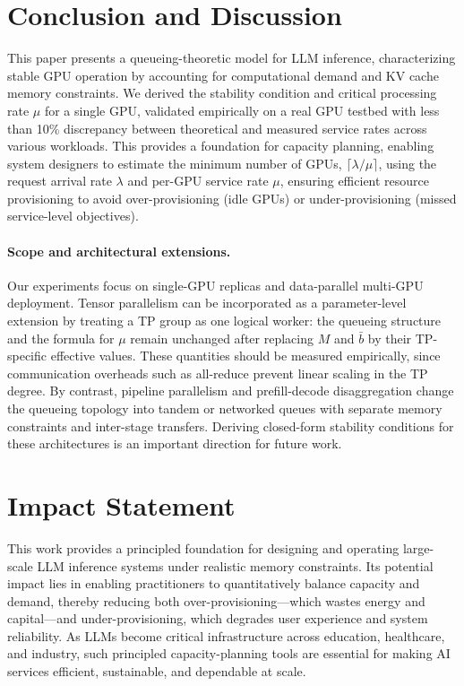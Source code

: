 \documentclass{article}
\theoremstyle{plain}
\theoremstyle{definition}
\theoremstyle{remark}
\begin{document}
\section{Conclusion and Discussion}
\label{sec:conclusion}

This paper presents a queueing-theoretic model for LLM inference, characterizing stable GPU operation by accounting for computational demand and KV cache memory constraints. We derived the stability condition and critical processing rate $\mu$ for a single GPU, validated empirically on a real GPU testbed with less than 10\% discrepancy between theoretical and measured service rates across various workloads. This provides a foundation for capacity planning, enabling system designers to estimate the minimum number of GPUs, $\lceil \lambda / \mu \rceil$, using the request arrival rate $\lambda$ and per-GPU service rate $\mu$, ensuring efficient resource provisioning to avoid over-provisioning (idle GPUs) or under-provisioning (missed service-level objectives).

\paragraph{Scope and architectural extensions.}
Our experiments focus on single-GPU replicas and data-parallel multi-GPU deployment. 
Tensor parallelism can be incorporated as a parameter-level extension by treating a TP group as one logical worker: the queueing structure and the formula for $\mu$ remain unchanged after replacing $M$ and $\bar b$ by their TP-specific effective values. 
These quantities should be measured empirically, since communication overheads such as all-reduce prevent linear scaling in the TP degree. 
By contrast, pipeline parallelism and prefill-decode disaggregation change the queueing topology into tandem or networked queues with separate memory constraints and inter-stage transfers. 
Deriving closed-form stability conditions for these architectures is an important direction for future work.

\section*{Impact Statement}

This work provides a principled foundation for designing and operating large-scale LLM inference systems under realistic memory constraints. Its potential impact lies in enabling practitioners to quantitatively balance capacity and demand, thereby reducing both over-provisioning—which wastes energy and capital—and under-provisioning, which degrades user experience and system reliability. As LLMs become critical infrastructure across education, healthcare, and industry, such principled capacity-planning tools are essential for making AI services efficient, sustainable, and dependable at scale.
\end{document}

